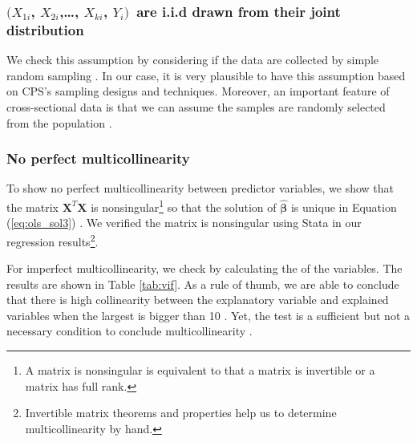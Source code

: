 \subsubsection{$(X_{1i}$, $X_{2i}$,\dots, $X_{ki}$, $Y_{i})\,$ are \acs{i.i.d} drawn from their joint distribution}
We check this assumption by considering if the data are collected by simple random sampling \cite{stock_watson_2019}. In our case, it is very plausible to have this assumption based on \acs{CPS}'s sampling designs and techniques. Moreover, an important feature of cross-sectional data is that we can assume the samples are randomly selected from the population \cite{wooldridge_2020}.

\subsubsection{No perfect multicollinearity}
To show no perfect multicollinearity between predictor variables, we show that the matrix $\pmb{X}^T\pmb{X}$ is nonsingular\footnote{A matrix is nonsingular is equivalent to that a matrix is invertible or a matrix has full rank.} so that the solution of $\pmb{\hat{\beta}}$ is unique in Equation (\ref{eq:ols_sol3}) \cite{christopher_2006, stock_watson_2019, kuter_nachtsheim_neter_li_2005}. We verified the matrix is nonsingular using Stata in our regression results\footnote{Invertible matrix theorems and properties help us to determine multicollinearity by hand.}.

For imperfect multicollinearity, we check by calculating the \hyperref[appendix:notations]{} of the variables. The results are shown in Table \ref{tab:vif}. As a rule of thumb, we are able to conclude that there is high collinearity between the explanatory variable and explained variables when the largest \hyperref[appendix:notations]{} is bigger than 10 \cite{christopher_2006, kuter_nachtsheim_neter_li_2005, wooldridge_2020}. Yet, the \hyperref[appendix:notations]{} test is a sufficient but not a necessary condition to conclude multicollinearity \cite{studenmund_2017}.



